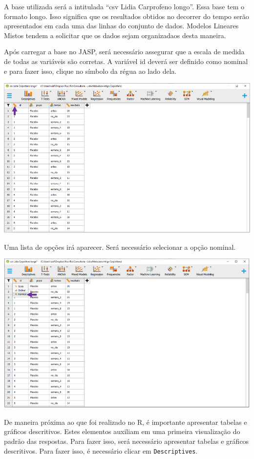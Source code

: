\documentclass[
]{book}
\begin{document}
A base utilizada será a intitulada ``csv Lidia Carprofeno longo''. Essa
base tem o formato longo. Isso significa que os resultados obtidos no
decorrer do tempo serão apresentados em cada uma das linhas do conjunto
de dados. Modelos Lineares Mistos tendem a solicitar que os dados sejam
organizadaos desta maneira.

Após carregar a base no JASP, será necessário assegurar que a escala de
medida de todas as variáveis são corretas. A variável id deverá ser
definido como nominal e para fazer isso, clique no símbolo da régua ao
lado dela.

\includegraphics{./img/cap_lmm_nivel_medida.png}

Uma lista de opções irá aparecer. Será necessário selecionar a opção
nominal.

\includegraphics{./img/cap_lmm_nivel_medida2.png}

De maneira próxima ao que foi realizado no R, é importante apresentar
tabelas e gráficos descritivos. Estes elementos auxiliam em uma primeira
visualização do padrão das respostas. Para fazer isso, será necessário
apresentar tabelas e gráficos descritivos. Para fazer isso, é necessário
clicar em \texttt{Descriptives}.
\end{document}
